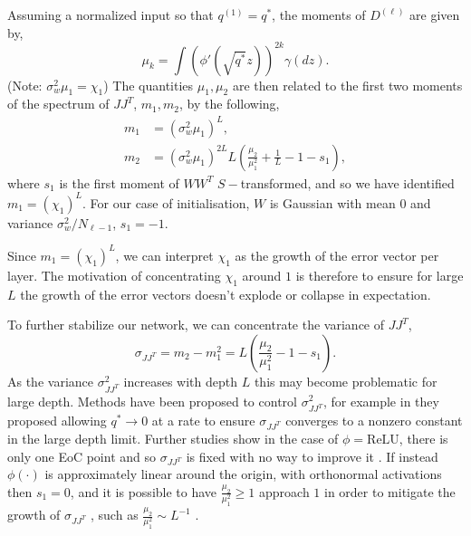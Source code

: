 \documentclass{article}
\theoremstyle{plain}
\theoremstyle{definition}
\theoremstyle{remark}
\begin{document}
Assuming a normalized input so that $q^{(1)}=q^*$, the moments of $D^{(\ell)}$ are given by,
\begin{equation}
    \mu_k = \int \left( \phi' \left( \sqrt{q^*}z \right) \right)^{2k} \gamma(dz). \label{eq:moments_of_diag_jacobian_general}
\end{equation}
(Note: $\sigma_w^2 \mu_1 = \chi_1$)
The quantities $\mu_1, \mu_2$ are then related to the first two moments of the spectrum of $JJ^T$, $m_1, m_2$, by the following,
\begin{align}
m_1 &= \left( \sigma_w^2 \mu_1 \right)^L, \\
m_2 &= \left( \sigma_w^2 \mu_1 \right)^{2L}L \left( \frac{\mu_2}{\mu_1^2} + \frac{1}{L} -1-s_1 \right),
\end{align}
where $s_1$ is the first moment of $WW^T$ $S-$transformed, and so we have identified $m_1 = (\chi_1)^L$. For our case of initialisation, $W$ is Gaussian with mean $0$ and variance $\sigma_w^2/N_{\ell-1}$, $s_1=-1$.

Since $m_1 = \left( \chi_1 \right)^L$, we can interpret $\chi_1$ as the growth of the error vector per layer.
The motivation of concentrating $\chi_1$ around $1$ is therefore to ensure for large $L$ the growth of the error vectors doesn't explode or collapse in expectation. 



To further stabilize our network, we can concentrate the variance of $JJ^T$,
\begin{equation}
    \sigma_{JJ^T} = m_2 - m_1^2 = L \left( \frac{\mu_2}{\mu_1^2} - 1 - s_1 \right).
\end{equation}
As the variance $\sigma_{JJ^T
}^2$ increases with depth $L$ this may become problematic for large depth. Methods have been proposed to control $\sigma_{JJ^T}^2$, for example in \cite{pennington_emergence_2018} they proposed allowing $q^* \rightarrow 0$ at a rate to ensure $\sigma_{JJ^T}$ converges to a nonzero constant in the large depth limit.
Further studies show in the case of $\phi = \text{ReLU}$, there is only one EoC point and so $\sigma_{JJ^T}$ is fixed with no way to improve it \cite{pennington_emergence_2018}. If instead $\phi \left( \cdot \right)$ is approximately linear around the origin, with orthonormal activations then $s_1=0$, and it is possible to have $\frac{\mu_2}{\mu_1^2} \geq 1$ approach $1$ in order to mitigate the growth of $\sigma_{JJ^T}$ \cite{murray_activation_2022}, such as $\frac{\mu_2}{\mu_1^2} \sim L^{-1}$ \cite{martens_rapid_2021}.
\end{document}

